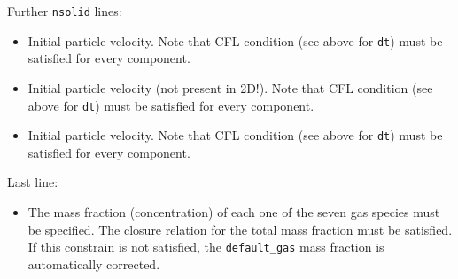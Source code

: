 Further {\tt nsolid} lines:
\begin{itemize}
\item
{}
{Initial particle velocity.
Note that CFL condition (see above for {\tt dt}) 
must be satisfied for every component.}

\item
{}
{Initial particle velocity (not present in 2D!).
Note that CFL condition (see above for {\tt dt}) 
must be satisfied for every component.}

\item
{}
{Initial particle velocity.
Note that CFL condition (see above for {\tt dt}) 
must be satisfied for every component.}

\end{itemize}

Last line:

\begin{itemize}

\item
{}
{The mass fraction (concentration) of each one of the seven gas species must be
specified. The closure relation for the total mass fraction must be satisfied.
If this constrain is not satisfied, the {\tt default\_gas} mass fraction is
automatically corrected.}

\end{itemize}
